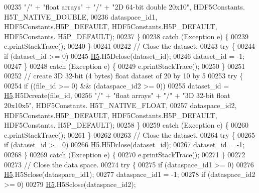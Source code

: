 \begin{DoxyCode}
00235                         \textcolor{stringliteral}{"/"} + \textcolor{stringliteral}{"float arrays"} + \textcolor{stringliteral}{"/"} + \textcolor{stringliteral}{"2D 64-bit double 20x10"}, HDF5Constants.
      H5T\_NATIVE\_DOUBLE,
00236                         dataspace\_id1, HDF5Constants.H5P\_DEFAULT, HDF5Constants.H5P\_DEFAULT, HDF5Constants.
      H5P\_DEFAULT);
00237         \}
00238         \textcolor{keywordflow}{catch} (Exception e) \{
00239             e.printStackTrace();
00240         \}
00241 
00242         \textcolor{comment}{// Close the dataset.}
00243         \textcolor{keywordflow}{try} \{
00244             \textcolor{keywordflow}{if} (dataset\_id >= 0)
00245                 \hyperlink{namespace_h5}{H5}.H5Dclose(dataset\_id);
00246             dataset\_id = -1;
00247         \}
00248         \textcolor{keywordflow}{catch} (Exception e) \{
00249             e.printStackTrace();
00250         \}
00251 
00252         \textcolor{comment}{// create 3D 32-bit (4 bytes) float dataset of 20 by 10 by 5}
00253         \textcolor{keywordflow}{try} \{
00254             \textcolor{keywordflow}{if} ((file\_id >= 0) && (dataspace\_id2 >= 0))
00255                 dataset\_id = \hyperlink{namespace_h5}{H5}.H5Dcreate(file\_id,
00256                         \textcolor{stringliteral}{"/"} + \textcolor{stringliteral}{"float arrays"} + \textcolor{stringliteral}{"/"} + \textcolor{stringliteral}{"3D 32-bit float  20x10x5"}, HDF5Constants.
      H5T\_NATIVE\_FLOAT,
00257                         dataspace\_id2, HDF5Constants.H5P\_DEFAULT, HDF5Constants.H5P\_DEFAULT, HDF5Constants.
      H5P\_DEFAULT);
00258         \}
00259         \textcolor{keywordflow}{catch} (Exception e) \{
00260             e.printStackTrace();
00261         \}
00262 
00263         \textcolor{comment}{// Close the dataset.}
00264         \textcolor{keywordflow}{try} \{
00265             \textcolor{keywordflow}{if} (dataset\_id >= 0)
00266                 \hyperlink{namespace_h5}{H5}.H5Dclose(dataset\_id);
00267             dataset\_id = -1;
00268         \}
00269         \textcolor{keywordflow}{catch} (Exception e) \{
00270             e.printStackTrace();
00271         \}
00272 
00273         \textcolor{comment}{// Close the data space.}
00274         \textcolor{keywordflow}{try} \{
00275             \textcolor{keywordflow}{if} (dataspace\_id1 >= 0)
00276                 \hyperlink{namespace_h5}{H5}.H5Sclose(dataspace\_id1);
00277             dataspace\_id1 = -1;
00278             \textcolor{keywordflow}{if} (dataspace\_id2 >= 0)
00279                 \hyperlink{namespace_h5}{H5}.H5Sclose(dataspace\_id2);

\end{DoxyCode}
